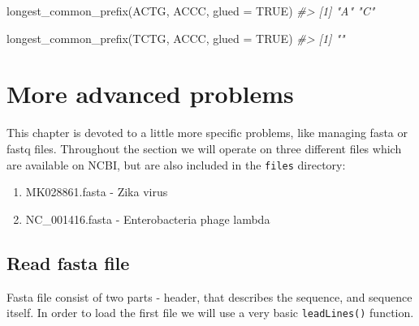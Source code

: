 \documentclass[
]{book}
\newenvironment{Shaded}{\begin{snugshade}}{\end{snugshade}}
\newcommand{\AttributeTok}[1]{\textcolor[rgb]{0.77,0.63,0.00}{#1}}
\newcommand{\CommentTok}[1]{\textcolor[rgb]{0.56,0.35,0.01}{\textit{#1}}}
\newcommand{\ConstantTok}[1]{\textcolor[rgb]{0.00,0.00,0.00}{#1}}
\newcommand{\FunctionTok}[1]{\textcolor[rgb]{0.00,0.00,0.00}{#1}}
\newcommand{\NormalTok}[1]{#1}
\newcommand{\StringTok}[1]{\textcolor[rgb]{0.31,0.60,0.02}{#1}}
\begin{document}
\begin{Shaded}
\begin{Highlighting}[]
\FunctionTok{longest\_common\_prefix}\NormalTok{(}\StringTok{\textquotesingle{}ACTG\textquotesingle{}}\NormalTok{, }\StringTok{\textquotesingle{}ACCC\textquotesingle{}}\NormalTok{, }\AttributeTok{glued =} \ConstantTok{TRUE}\NormalTok{)}
\CommentTok{\#\textgreater{} [1] "A" "C"}

\FunctionTok{longest\_common\_prefix}\NormalTok{(}\StringTok{\textquotesingle{}TCTG\textquotesingle{}}\NormalTok{, }\StringTok{\textquotesingle{}ACCC\textquotesingle{}}\NormalTok{, }\AttributeTok{glued =} \ConstantTok{TRUE}\NormalTok{)}
\CommentTok{\#\textgreater{} [1] ""}
\end{Highlighting}
\end{Shaded}

\hypertarget{advanced}{%
\chapter{More advanced problems}\label{advanced}}

This chapter is devoted to a little more specific problems, like managing fasta or fastq files. Throughout the section we will operate on three different files which are available on NCBI, but are also included in the \texttt{files} directory:

\begin{enumerate}
\def\labelenumi{\arabic{enumi}.}
\item
  MK028861.fasta - Zika virus
\item
  NC\_001416.fasta - Enterobacteria phage lambda
\end{enumerate}

\hypertarget{read-fasta-file}{%
\section{Read fasta file}\label{read-fasta-file}}

Fasta file consist of two parts - header, that describes the sequence, and sequence itself. In order to load the first file we will use a very basic \texttt{leadLines()} function.
\end{document}
